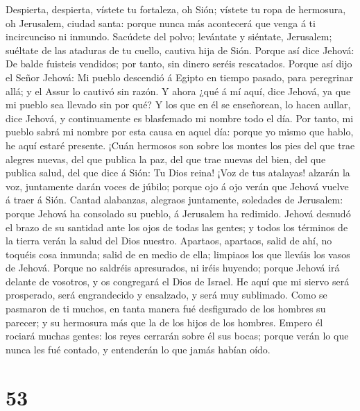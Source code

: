  Despierta, despierta, vístete tu fortaleza, oh Sión;
vístete tu ropa de hermosura, oh Jerusalem, ciudad santa: porque nunca
más acontecerá que venga á ti incircunciso ni inmundo. 
Sacúdete del polvo; levántate y siéntate, Jerusalem; suéltate de las
ataduras de tu cuello, cautiva hija de Sión.  Porque así
dice Jehová: De balde fuisteis vendidos; por tanto, sin dinero seréis
rescatados.  Porque así dijo el Señor Jehová: Mi pueblo
descendió á Egipto en tiempo pasado, para peregrinar allá; y el Assur lo
cautivó sin razón.  Y ahora ¿qué á mí aquí, dice Jehová,
ya que mi pueblo sea llevado sin por qué? Y los que en él se enseñorean,
lo hacen aullar, dice Jehová, y continuamente es blasfemado mi nombre
todo el día.  Por tanto, mi pueblo sabrá mi nombre por
esta causa en aquel día: porque yo mismo que hablo, he aquí estaré
presente.  ¡Cuán hermosos son sobre los montes los pies
del que trae alegres nuevas, del que publica la paz, del que trae nuevas
del bien, del que publica salud, del que dice á Sión: Tu Dios reina!
 ¡Voz de tus atalayas! alzarán la voz, juntamente darán
voces de júbilo; porque ojo á ojo verán que Jehová vuelve á traer á
Sión.  Cantad alabanzas, alegraos juntamente, soledades de
Jerusalem: porque Jehová ha consolado su pueblo, á Jerusalem ha
redimido.  Jehová desnudó el brazo de su santidad ante
los ojos de todas las gentes; y todos los términos de la tierra verán la
salud del Dios nuestro.  Apartaos, apartaos, salid de
ahí, no toquéis cosa inmunda; salid de en medio de ella; limpiaos los
que lleváis los vasos de Jehová.  Porque no saldréis
apresurados, ni iréis huyendo; porque Jehová irá delante de vosotros, y
os congregará el Dios de Israel.  He aquí que mi siervo
será prosperado, será engrandecido y ensalzado, y será muy sublimado.
 Como se pasmaron de ti muchos, en tanta manera fué
desfigurado de los hombres su parecer; y su hermosura más que la de los
hijos de los hombres.  Empero él rociará muchas gentes:
los reyes cerrarán sobre él sus bocas; porque verán lo que nunca les fué
contado, y entenderán lo que jamás habían oído.

\hypertarget{section-52}{%
\section{53}\label{section-52}}

